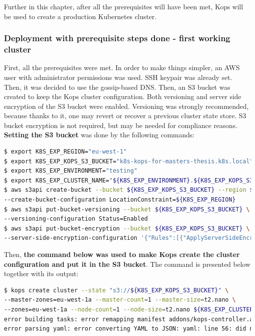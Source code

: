 Further in this chapter, after all the prerequisites will have been met, Kops will be used to create a production Kubernetes cluster.

\subsubsection{Deployment with prerequisite steps done - first working cluster}

First, all the prerequisites were met. In order to make things simpler, an AWS user with administrator permissions was used. SSH keypair was already set. Then, it was decided to use the gossip-based DNS. Then, an S3 bucket was created to keep the Kops cluster configuration. Both versioning and server side encryption of the S3 bucket were enabled. Versioning was strongly recommended, because thanks to it, one may revert or recover a previous cluster state store. S3 bucket encryption is not required, but may be needed for compliance reasons\cite{online-kops-aws}. \textbf{Setting the S3 bucket} was done by the following commands:
\begin{lstlisting}[basicstyle=\tiny,caption={Commands used to set an AWS S3 bucket for Kops},captionpos=b,language=Bash,xleftmargin=1cm]
$ export K8S_EXP_REGION="eu-west-1"
$ export K8S_EXP_KOPS_S3_BUCKET="k8s-kops-for-masters-thesis.k8s.local"
$ export K8S_EXP_ENVIRONMENT="testing"
$ export K8S_EXP_CLUSTER_NAME="${K8S_EXP_ENVIRONMENT}.${K8S_EXP_KOPS_S3_BUCKET}"
$ aws s3api create-bucket --bucket ${K8S_EXP_KOPS_S3_BUCKET} --region ${K8S_EXP_REGION} \
--create-bucket-configuration LocationConstraint=${K8S_EXP_REGION}
$ aws s3api put-bucket-versioning --bucket ${K8S_EXP_KOPS_S3_BUCKET} \
--versioning-configuration Status=Enabled
$ aws s3api put-bucket-encryption --bucket ${K8S_EXP_KOPS_S3_BUCKET} \
--server-side-encryption-configuration '{"Rules":[{"ApplyServerSideEncryptionByDefault":{"SSEAlgorithm":"AES256"}}]}'
\end{lstlisting}

Then, \textbf{the command below was used to make Kops create the cluster configuration and put it in the S3 bucket}. The command is presented below together with its output:
\begin{lstlisting}[basicstyle=\tiny,caption={Command used to make Kops create the cluster configuration and put it in the S3 bucket},captionpos=b,language=Bash,xleftmargin=1cm]
$ kops create cluster --state "s3://${K8S_EXP_KOPS_S3_BUCKET}" \
--master-zones=eu-west-1a --master-count=1 --master-size=t2.nano \
--zones=eu-west-1a --node-count=1 --node-size=t2.nano ${K8S_EXP_CLUSTER_NAME}
error building tasks: error remapping manifest addons/kops-controller.addons.k8s.io/k8s-1.16.yaml: \
error parsing yaml: error converting YAML to JSON: yaml: line 56: did not find expected alphabetic or numeric character
\end{lstlisting}

